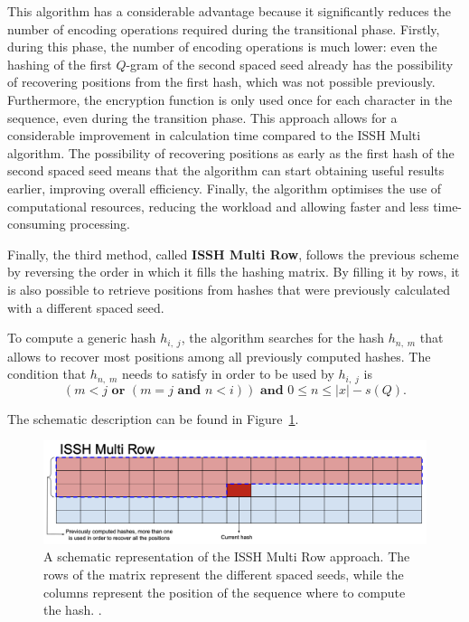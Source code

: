 This algorithm has a considerable advantage because it significantly reduces the number of encoding operations required during the transitional phase. Firstly, during this phase, the number of encoding operations is much lower: even the hashing of the first $Q$-gram of the second spaced seed already has the possibility of recovering positions from the first hash, which was not possible previously. Furthermore, the encryption function is only used once for each character in the sequence, even during the transition phase. This approach allows for a considerable improvement in calculation time compared to the ISSH Multi algorithm. The possibility of recovering positions as early as the first hash of the second spaced seed means that the algorithm can start obtaining useful results earlier, improving overall efficiency. Finally, the algorithm optimises the use of computational resources, reducing the workload and allowing faster and less time-consuming processing.

Finally, the third method, called \textbf{ISSH Multi Row}, follows the previous scheme by reversing the order in which it fills the hashing matrix. By filling it by rows, it is also possible to retrieve positions from hashes that were previously calculated with a different spaced seed.

To compute a generic hash $h_{i,\; j}$, the algorithm searches for the hash $h_{n,\; m}$ that allows to recover most positions among all previously computed hashes. The condition that $h_{n,\; m}$ needs to satisfy in order to be used by $h_{i,\; j}$ is \begin{equation}\label{eq:issh_multi_row_condition}
	(m < j \textbf{ or } (m = j \textbf{ and } n < i)) \textbf{ and } 0 \leq n \leq |x| - s(Q).
\end{equation}

The schematic description can be found in Figure~\ref{fig:issh_multi_row}.

\begin{figure}[!ht]
	\centering
	\includegraphics[width=0.85\linewidth]{images/issh_multi_row}
	\caption[A schematic representation of the ISSH Multi Row approach]{A schematic representation of the ISSH Multi Row approach. The rows of the matrix represent the different spaced seeds, while the columns represent the position of the sequence where to compute the hash. \cite{mian2023missh}.}
	\label{fig:issh_multi_row}
\end{figure}

